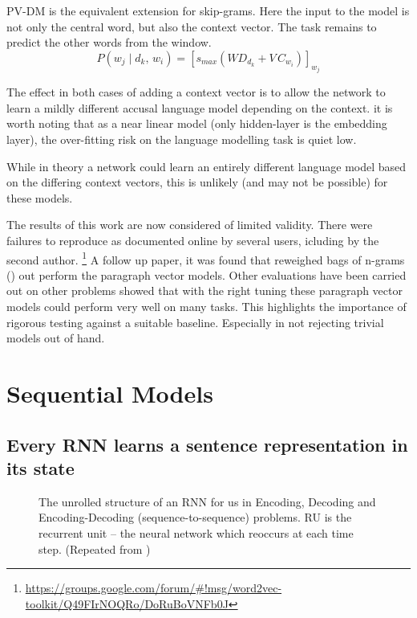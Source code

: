 \documentclass[12pt,parskip]{komatufte}
\begin{document}
PV-DM is the equivalent extension for skip-grams.
Here the input to the model is not only the central word, but also the context vector.
The task remains to predict the other words from the window.
\begin{equation}
P(w_j \mid d_k,\, w_{i}) = \left[ s_{max}(WD_{d_k} + V\,C_{w_{i}}) \right]_{w_j} 
\end{equation}

The effect in both cases of adding a context vector is to allow the network to learn a mildly different accusal language model depending on the context.
it is worth noting that as a near linear model (only hidden-layer is the embedding layer), the over-fitting risk on the language modelling task is quiet low.

While in theory a network could learn an entirely different language model based on the differing context vectors,
this is unlikely (and may not be possible) for these models. 




The results of this work are now considered of limited validity.
There were failures to reproduce as documented online by several users,
icluding by the second author.
 \footnote{ \url{https://groups.google.com/forum/\#!msg/word2vec-toolkit/Q49FIrNOQRo/DoRuBoVNFb0J}}
A follow up paper,  it was found that reweighed bags of n-grams \pcite() out perform the paragraph vector models.
Other evaluations have been carried out on other problems \textcite{lau2016doc2vecissues} showed that with the right tuning these paragraph vector models could perform very well on many tasks.
This highlights the importance of rigorous testing against a suitable baseline.
Especially in not rejecting trivial models out of hand.






\section{Sequential Models}

\subsection{Every RNN learns a sentence representation in its state}
\begin{figure}
	\caption{The unrolled structure of an RNN for us in Encoding, Decoding and Encoding-Decoding (sequence-to-sequence) problems. RU is the recurrent unit -- the neural network which reoccurs at each time step. (Repeated from )
	}
	
	\label{fig-rnns-sq}
	
	\resizebox{\textwidth}{!}{}
\end{figure}
\end{document}
